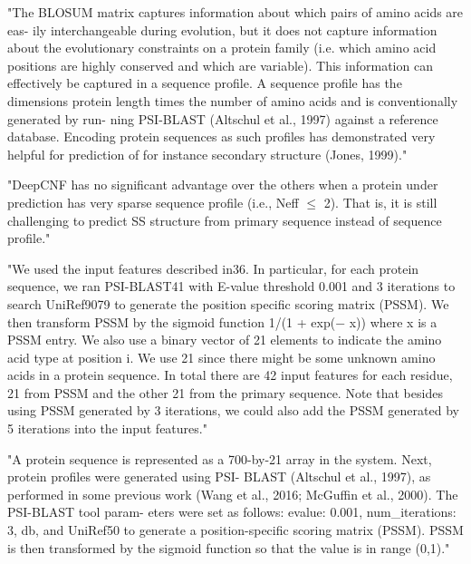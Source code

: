 	"The BLOSUM matrix captures information about which pairs of amino acids are eas- ily interchangeable during evolution, but it does not capture information about the evolutionary constraints on a protein family (i.e. which amino acid positions are highly conserved and which are variable). This information can effectively be captured in a sequence profile. A sequence profile has the dimensions protein length times the number of amino acids and is conventionally generated by run- ning PSI-BLAST (Altschul et al., 1997) against a reference database. Encoding protein sequences as such profiles has demonstrated very helpful for prediction of for instance secondary structure (Jones, 1999)." \cite{Jurtz2017}

	"DeepCNF has no significant advantage over the others when a protein under prediction has very sparse sequence profile (i.e., Neff $≤$ 2). That is, it is still challenging to predict SS structure from primary sequence instead of sequence profile." \cite{Wang2016}

	"We used the input features described in36. In particular, for each protein sequence, we ran PSI-BLAST41 with E-value threshold 0.001 and 3 iterations to search UniRef9079 to generate the position specific scoring matrix (PSSM). We then transform PSSM by the sigmoid function 1/(1 + exp(− x)) where x is a PSSM entry. We also use a binary vector of 21 elements to indicate the amino acid type at position i. We use 21 since there might be some unknown amino acids in a protein sequence. In total there are 42 input features for each residue, 21 from PSSM and the other 21 from the primary sequence. Note that besides using PSSM generated by 3 iterations, we could also add the PSSM generated by 5 iterations into the input features." \cite{Wang2016}

	"A protein sequence is represented as a 700-by-21 array in the system. Next, protein profiles were generated using PSI- BLAST (Altschul et al., 1997), as performed in some previous work (Wang et al., 2016; McGuffin et al., 2000). The PSI-BLAST tool param- eters were set as follows: evalue: 0.001, num\_iterations: 3, db, and UniRef50 to generate a position-specific scoring matrix (PSSM). PSSM is then transformed by the sigmoid function so that the value is in range (0,1)." \cite{Fang2017}

